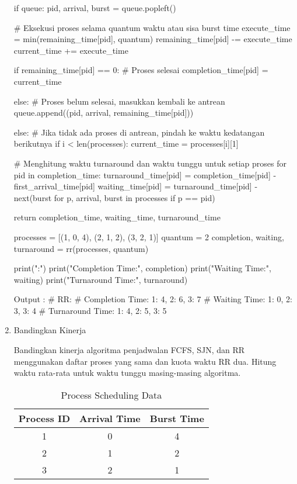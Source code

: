 \documentclass[12pt]{article}
\begin{document}
\begin{enumerate}
\begin{python}
        if queue:
            pid, arrival, burst = queue.popleft()
            
            # Eksekusi proses selama quantum waktu atau sisa burst time
            execute_time = min(remaining_time[pid], quantum)
            remaining_time[pid] -= execute_time
            current_time += execute_time

            if remaining_time[pid] == 0:  # Proses selesai
                completion_time[pid] = current_time
            
            else:  # Proses belum selesai, masukkan kembali ke antrean
                queue.append((pid, arrival, remaining_time[pid]))
        
        else:
            # Jika tidak ada proses di antrean, pindah ke waktu kedatangan berikutnya
            if i < len(processes):
                current_time = processes[i][1]  

    # Menghitung waktu turnaround dan waktu tunggu untuk setiap proses
    for pid in completion_time:
        turnaround_time[pid] = completion_time[pid] - first_arrival_time[pid]
        waiting_time[pid] = turnaround_time[pid] - next(burst for p, arrival, burst in processes if p == pid)

    return completion_time, waiting_time, turnaround_time

processes = [(1, 0, 4), (2, 1, 2), (3, 2, 1)]
quantum = 2
completion, waiting, turnaround = rr(processes, quantum)

print("\nRR:")
print("Completion Time:", completion)
print("Waiting Time:", waiting)
print("Turnaround Time:", turnaround)

Output : 
# RR:
# Completion Time: {1: 4, 2: 6, 3: 7}
# Waiting Time: {1: 0, 2: 3, 3: 4}
# Turnaround Time: {1: 4, 2: 5, 3: 5}
\end{python}
        
    \item Bandingkan Kinerja
        \par  Bandingkan kinerja algoritma penjadwalan FCFS, SJN, dan RR menggunakan daftar proses yang sama dan kuota waktu RR dua. Hitung waktu rata-rata untuk waktu tunggu masing-masing algoritma.
        \begin{table}[h!]
        \centering
        \begin{tabular}{|c|c|c|}
        \hline
        \textbf{Process ID} & \textbf{Arrival Time} & \textbf{Burst Time} \\ \hline
        1 & 0 & 4 \\ \hline
        2 & 1 & 2 \\ \hline
        3 & 2 & 1 \\ \hline
        \end{tabular}
        \caption{Process Scheduling Data}
        \end{table}
        

\end{enumerate}
\end{document}
